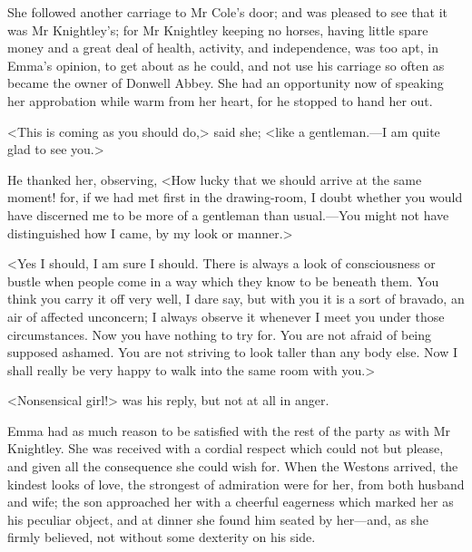 She followed another carriage to Mr Cole's door; and was pleased to see that it was Mr Knightley's; for Mr Knightley keeping no horses, having little spare money and a great deal of health, activity, and independence, was too apt, in Emma's opinion, to get about as he could, and not use his carriage so often as became the owner of Donwell Abbey. She had an opportunity now of speaking her approbation while warm from her heart, for he stopped to hand her out.

<This is coming as you should do,> said she; <like a gentleman.—I am quite glad to see you.>

He thanked her, observing, <How lucky that we should arrive at the same moment! for, if we had met first in the drawing-room, I doubt whether you would have discerned me to be more of a gentleman than usual.—You might not have distinguished how I came, by my look or manner.>

<Yes I should, I am sure I should. There is always a look of consciousness or bustle when people come in a way which they know to be beneath them. You think you carry it off very well, I dare say, but with you it is a sort of bravado, an air of affected unconcern; I always observe it whenever I meet you under those circumstances. Now you have nothing to try for. You are not afraid of being supposed ashamed. You are not striving to look taller than any body else. Now I shall really be very happy to walk into the same room with you.>

<Nonsensical girl!> was his reply, but not at all in anger.

Emma had as much reason to be satisfied with the rest of the party as with Mr Knightley. She was received with a cordial respect which could not but please, and given all the consequence she could wish for. When the Westons arrived, the kindest looks of love, the strongest of admiration were for her, from both husband and wife; the son approached her with a cheerful eagerness which marked her as his peculiar object, and at dinner she found him seated by her—and, as she firmly believed, not without some dexterity on his side.

